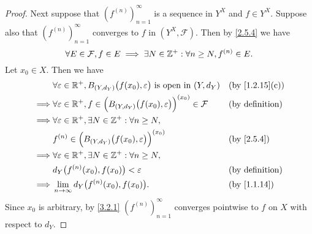 \begin{proof}
  Next suppose that \((f^{(n)})_{n = 1}^\infty\) is a sequence in \(Y^X\) and \(f \in Y^X\).
  Suppose also that \((f^{(n)})_{n = 1}^\infty\) converges to \(f\) in \((Y^X, \mathcal{F})\).
  Then by \cref{2.5.4} we have
  \[
    \forall E \in \mathcal{F}, f \in E \implies \exists N \in \mathbb{Z}^+ : \forall n \geq N, f^{(n)} \in E.
  \]
  Let \(x_0 \in X\).
  Then we have
  \begin{align*}
             & \forall \varepsilon \in \R^+, B_{(Y, d_Y)}\big(f(x_0), \varepsilon\big) \text{ is open in } (Y, d_Y)            &  & \text{(by \cref{1.2.15}(c))} \\
    \implies & \forall \varepsilon \in \R^+, f \in \Big(B_{(Y, d_Y)}\big(f(x_0), \varepsilon\big)\Big)^{(x_0)} \in \mathcal{F} &  & \text{(by definition)}       \\
    \implies & \forall \varepsilon \in \R^+, \exists N \in \Z^+ : \forall n \geq N,                                                                              \\
             & f^{(n)} \in \Big(B_{(Y, d_Y)}\big(f(x_0), \varepsilon\big)\Big)^{(x_0)}                                         &  & \by{2.5.4}                   \\
    \implies & \forall \varepsilon \in \R^+, \exists N \in \Z^+ : \forall n \geq N,                                                                              \\
             & d_Y\big(f^{(n)}(x_0), f(x_0)\big) < \varepsilon                                                                 &  & \text{(by definition)}       \\
    \implies & \lim_{n \to \infty} d_Y\big(f^{(n)}(x_0), f(x_0)\big).                                                          &  & \by{1.1.14}
  \end{align*}
  Since \(x_0\) is arbitrary, by \cref{3.2.1} \((f^{(n)})_{n = 1}^\infty\) converges pointwise to \(f\) on \(X\) with respect to \(d_Y\).


\end{proof}
